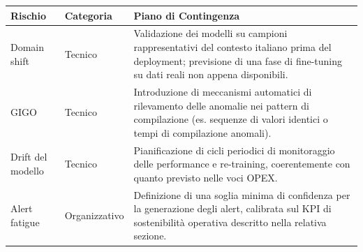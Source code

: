 \vspace{0.3cm}
\begin{table}[H]
    \centering
    \renewcommand{\arraystretch}{1.5}
    \small
    \begin{tabular}{|p{}|p{}|p{}|}
        \hline
        \textbf{Rischio}           & \textbf{Categoria} & \textbf{Piano di Contingenza}                                                                                                                                                                                                                                                                                                                                                                                                              \\
        \hline
        Domain shift               & Tecnico            & Validazione dei modelli su campioni rappresentativi del contesto italiano prima del deployment; previsione di una fase di fine-tuning su dati reali non appena disponibili.                                                                                                                                                                                                                                                                \\
        \hline
        GIGO                       & Tecnico            & Introduzione di meccanismi automatici di rilevamento delle anomalie nei pattern di compilazione (es. sequenze di valori identici o tempi di compilazione anomali).                                                                                                                                                                                                                                                                         \\
        \hline
        Drift del modello          & Tecnico            & Pianificazione di cicli periodici di monitoraggio delle performance e re-training, coerentemente con quanto previsto nelle voci OPEX.                                                                                                                                                                                                                                                                                                      \\
        \hline
        Alert fatigue              & Organizzativo      & Definizione di una soglia minima di confidenza per la generazione degli alert, calibrata sul KPI di sostenibilità operativa descritto nella relativa sezione.                                                                                                                                                                                                                                                                              \\

\end{tabular}
\end{table}
